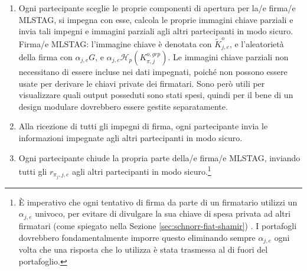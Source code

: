 \begin{enumerate}
\begin{enumerate}
        L'iniziatore invia tutte queste informazioni agli altri partecipanti in modo sicuro.\footnote{Non ha bisogno di inviare direttamente gli importi di output $b_t$, poiché possono essere calcolati da $\mathit{amount}_t$. Monero adotta l'approccio ragionevole di creare una transazione parziale riempita con le informazioni selezionate dall'iniziatore, e inviandola ad altri co-firmatari insieme a un elenco di informazioni correlate come le chiavi private della transazione, indirizzi di destinazione, gli input reali, ecc.} Gli altri partecipanti possono confermare proseguendo nel prossimo step di comunicazione, oppure negoziare delle modifiche.
        \item Ogni partecipante sceglie le proprie componenti di apertura per la/e firma/e MLSTAG, si impegna con esse, calcola le proprie immagini chiave parziali e invia tali impegni e immagini parziali agli altri partecipanti in modo sicuro.\\

        Firma/e MLSTAG: l'immagine chiave è denotata con $\tilde{K}^{o}_{j,e}$, e l'aleatorietà della firma con $\alpha_{j,e} G$, e $\alpha_{j,e} \mathcal{H}_p(K^{o,grp}_{\pi,j})$. Le immagini chiave parziali non necessitano di essere incluse nei dati impegnati, poiché non possono essere usate per derivare le chiavi private dei firmatari. Sono però utili per visualizzare quali output posseduti sono stati spesi, quindi per il bene di un design modulare dovrebbero essere gestite separatamente.%
        \item Alla ricezione di tutti gli impegni di firma, ogni partecipante invia le informazioni impegnate agli altri partecipanti in modo sicuro.
        \item Ogni partecipante chiude la propria parte della/e firma/e MLSTAG, inviando tutti gli $r_{{\pi_j},j,e}$ agli altri partecipanti in modo sicuro.\footnote{È imperativo che ogni tentativo di firma da parte di un firmatario utilizzi un $\alpha_{j,e}$ univoco, per evitare di divulgare la sua chiave di spesa privata ad altri firmatari (come spiegato nella Sezione \ref{sec:schnorr-fiat-shamir}) \cite{MRL-0009-multisig}. I portafogli dovrebbero fondamentalmente imporre questo eliminando sempre $\alpha_{j,e}$ ogni volta che una risposta che lo utilizza è stata trasmessa al di fuori del portafoglio.}
    \end{enumerate}
\end{enumerate}

